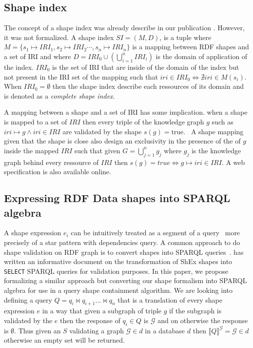 \fi

\subsection{Shape index}
The concept of a shape index was already describe in our publication . 
However, it was not formalized.
A shape index $SI = (M, D)$, is a tuple where $M = \{s_1 \mapsto IRI_1, s_2 \mapsto IRI_2 \cdots, s_n \mapsto IRI_n\}$ is a mapping between RDF shapes and a set of IRI 
and where $D = IRI_0 \cup (\bigcup\limits_{i=1}^{n} IRI_i)$ is the domain of application of the index.
$IRI_0$ is the set of IRI that are inside of the domain of the index but not present in the IRI set of the mapping such that 
$iri \in IRI_0 \iff \nexists iri \in M(s_i)$.
When $IRI_0 = \emptyset$ then the shape index describe each ressources of its domain and is denoted as a \emph{complete shape index}. 

A mapping between a shape and a set of IRI has some implication.
when a shape is mapped to a set of $IRI$ then every triple of the knowledge graph $g$ such as $iri \mapsto g \land iri \in IRI$
are validated by the shape $s(g) = \text{true}$.~
A shape mapping given that the shape is close also design an exclusivity in the presence of the of $g$ inside the mapped $IRI$ such that 
given $G = \bigcup\limits_{j=1}^{n} g_j$  where $g_j$ is the knowledge graph behind every ressource of $IRI$ then $s(g) = true \iff g \mapsto iri \in IRI$.
A web specification is also available online.~

\subsection{Expressing RDF Data shapes into SPARQL algebra}
A shape expression $e_i$ can be intuitively treated as a segment of a query~\cite{delva2023} more precisely of a star pattern with dependencies query.
A common approach to do shape validation on RDF graph is to convert shapes into SPARQL queries~\cite{labragayo2017validatingdescribinglinkeddata, Corman2019, spapeExpressionConvert}.
\citeauthor{spapeExpressionConvert} has written an informative document on the transformation of ShEx shapes into
\texttt{SELECT} SPARQL queries for validation purposes. 
In this paper, we propose formalizing a similar approach but converting our shape formalism into SPARQL algebra for use in a query shape containment algorithm.
We are looking into defining a query $Q = q_i \bowtie q_{i+1} ... \bowtie q_n$ that is a translation of every shape expression $e$ in a way that given a subgraph of triple $g$ if the 
subgraph is validated by the $e$ then the response of $q_i \in Q$ is $\mathcal{G}$ and on otherwise the response is $\emptyset$.
Thus given an $S$ validating a graph $\mathcal{G} \in d$ in a database $d$ then $\llbracket Q \rrbracket^{\mathcal{G}} = \mathcal{G} \in d$ otherwise an empty set will be returned.

